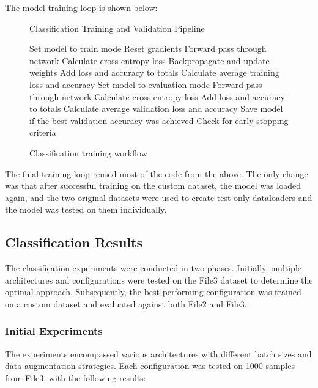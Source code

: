 \documentclass[conference]{IEEEtran}
\begin{document}
The model training loop is shown below:

\begin{figure}[H]
\begin{algorithm}[H]
\caption{Classification Training and Validation Pipeline}
\begin{algorithmic}[1]
    \STATE Set model to train mode
        \STATE Reset gradients
        \STATE Forward pass through network
        \STATE Calculate cross-entropy loss
        \STATE Backpropagate and update weights
        \STATE Add loss and accuracy to totals
    \ENDFOR
    \STATE Calculate average training loss and accuracy
    \STATE Set model to evaluation mode
        \STATE Forward pass through network
        \STATE Calculate cross-entropy loss
        \STATE Add loss and accuracy to totals
    \ENDFOR
    \STATE Calculate average validation loss and accuracy
    \STATE Save model if the best validation accuracy was achieved
    \STATE Check for early stopping criteria
\ENDFOR
\end{algorithmic}
\end{algorithm}
\caption{Classification training workflow}
\end{figure}

The final training loop reused most of the code from the above. The only change was that
after successful training on the custom dataset, the model was loaded again, and the two original
datasets were used to create test only dataloaders and the model was tested on them individually.

\subsection{Classification Results}

The classification experiments were conducted in two phases. Initially, multiple architectures
and configurations were tested on the File3 dataset to determine the optimal approach. Subsequently, the best
performing configuration was trained on a custom dataset and evaluated against both File2 and File3.

\subsubsection{Initial Experiments}

The experiments encompassed various architectures with different batch sizes and data augmentation strategies. Each
configuration was tested on 1000 samples from File3, with the following results:
\end{document}
